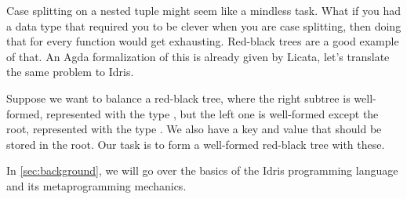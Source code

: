 Case splitting on a nested tuple might seem like a mindless task. What if you
had a data type that required you to be clever when you are case splitting,
then doing that for every function would get exhausting.
Red-black trees\cite{okasakiRedBlack} are a good example of that. An Agda
formalization of this is already given by Licata\cite{licataOPLSS}, let's
translate the same problem to Idris.

Suppose we want to balance a red-black tree, where
the right subtree is well-formed, represented with the type , but
the left one is well-formed except the root, represented with the type
. We also have a key and value that should be stored in
the root. Our task is to form a well-formed red-black tree with these.




In \autoref{sec:background}, we will go over the basics of the Idris
programming language and its metaprogramming mechanics.


